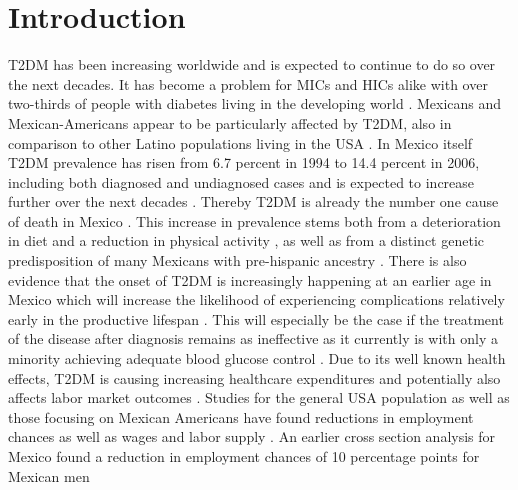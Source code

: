 \documentclass[12pt,english,british]{article}
\begin{document}
\section{\label{sec:Introduction}Introduction }

\ac{T2DM} has been increasing worldwide and is expected to continue to do so over the next decades. It has become a problem for \ac{MICs} and \ac{HICs} alike with over two-thirds of people with diabetes living in the developing world \citep{InternationalDiabetesFederation2013}. Mexicans and Mexican-Americans appear to be particularly affected by \ac{T2DM}, also in comparison to other Latino populations living in the \ac{USA} \citep{Schneiderman2014}. In Mexico itself \ac{T2DM} prevalence has risen from 6.7 percent in 1994 to 14.4 percent in 2006, including both diagnosed and undiagnosed cases \citep{Barquera2013} and is expected to increase further over the next decades \citep{Meza2015}. Thereby \ac{T2DM} is already the number one cause of death in Mexico \citep{23374611}. This increase in prevalence stems  both from a deterioration in diet and a reduction in physical activity \citep{Barquera2008b,Basu2013}, as well as from a distinct genetic predisposition of many Mexicans with pre-hispanic ancestry \citep{Williams2013}. There is also evidence that  the onset of \ac{T2DM} is increasingly happening at an earlier age in Mexico \citep{Villalpando2010} which will increase the likelihood of experiencing complications relatively early in the productive lifespan \citep{Barquera2013}. This will especially be the case if the treatment of the disease after diagnosis remains as ineffective as it currently is with only a minority achieving adequate blood glucose control \citep{Barquera2013}. Due to its well known health effects, \ac{T2DM} is causing increasing healthcare expenditures and potentially also affects labor market outcomes \citep{Seuring2015a}. Studies for the general \ac{USA} population as well as those focusing on Mexican Americans have found reductions in employment chances as well as wages and labor supply \citep{Brown2005,Brown2014,BrownIII2011,Minor2010,Minor2013}. An earlier cross section analysis for Mexico found a reduction in employment chances of 10 percentage points for Mexican men \citep{Seuring2015} 
\end{document}
